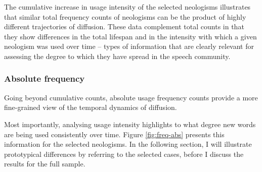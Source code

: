 \documentclass[
  a4paper,
  abstract=on,
  captions=tableabove
  ]{scrartcl}
\begin{document}
      The cumulative increase in usage intensity of the selected neologisms illustrates that similar total frequency counts of neologisms can be the product of highly different trajectories of diffusion. These data complement total counts in that they show differences in the total lifespan and in the intensity with which a given neologism was used over time -- types of information that are clearly relevant for assessing the degree to which they have spread in the speech community.


    \subsubsection{Absolute frequency}

      Going beyond cumulative counts, absolute usage frequency counts provide a more fine-grained view of the temporal dynamics of diffusion. 


      Most importantly, analysing usage intensity highlights to what degree new words are being used consistently over time. Figure \ref{fig:freq-abs} presents this information for the selected neologisms. In the following section, I will illustrate prototypical differences by referring to the selected cases, before I discuss the results for the full sample. 
\end{document}
